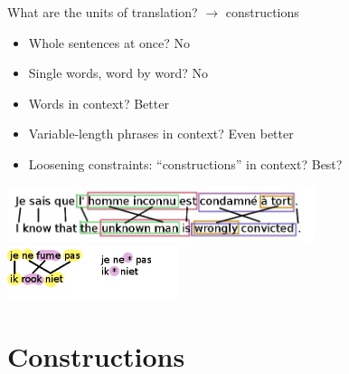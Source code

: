 \documentclass[compress]{beamer}
\begin{document}
\begin{frame}
	\begin{block}{What are the units of translation? $\rightarrow$ constructions }
		\begin{itemize}
			\item Whole sentences at once? No \\
			\item Single words, word by word? No \\
			\item Words in context? Better \\
			\item Variable-length phrases in context? Even better \\
			\item Loosening constraints: ``constructions'' in context? Best? \\
		\end{itemize}
	\end{block}

	\begin{center}
		 \includegraphics[width=90.0mm]{pbmbmt_alignment1c.jpg} \\
		 \includegraphics[width=50.0mm]{skipgram.png}
	\end{center}
\end{frame}


\section{Constructions}
\end{document}
